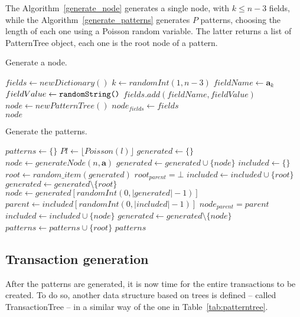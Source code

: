 \documentclass{acm_proc_article-sp-sigmod09}
\begin{document}
The Algorithm~\ref{generate_node} generates a single node, with $k \le n - 3$ fields, while the Algorithm~\ref{generate_patterns} generates $P$ patterns, choosing the length of each one using a Poisson random variable. The latter returns a list of PatternTree object, each one is the root node of a pattern.

\begin{algorithm}
\caption{Generate a node.}
\label{generate_node}
\begin{algorithmic}[1]
\State $fields \gets new Dictionary()$
	\State $k \gets randomInt(1, n - 3)$
	\State $fieldName \gets \boldsymbol{a}_k$
	\State $fieldValue \gets \text{\texttt{randomString()}}$
	\State $fields.add(fieldName, fieldValue)$
\EndFor
\State $node \gets new PatternTree()$
\State $node_{fields} \gets fields$ \\
\Return $node$
\EndFunction
\end{algorithmic}
\end{algorithm}

\begin{algorithm}
\caption{Generate the patterns.}
\label{generate_patterns}
\begin{algorithmic}[1]
\State $patterns \gets \{\}$
	\State $Pl \gets \lfloor Poisson(l) \rfloor$
	\State $generated \gets \{\}$
		\State $node \gets generateNode(n, \boldsymbol{a}) $ 
		\State $generated \gets generated \cup \{node\}$
	\EndFor
	\State $included \gets \{\}$
	\State $root \gets random\_item(generated)$
	\State $root_{parent} = \bot$
	\State $included \gets included \cup \{root\}$
	\State $generated \gets generated \setminus \{root\}$
		\State $node \gets generated[randomInt(0, |generated| - 1)]$
		\State $parent \gets included[randomInt(0, |included| - 1)]$
		\State $node_{parent} = parent$
		\State $included \gets included \cup \{node\}$
		\State $generated \gets generated \setminus \{node\}$
	\EndFor
	\State $patterns \gets patterns \cup \{root\}$
\EndFor
\Return $patterns$
\EndFunction
\end{algorithmic}
\end{algorithm}

\subsection{Transaction generation}
After the patterns are generated, it is now time for the entire transactions to be created. To do so, another data structure based on trees is defined -- called TransactionTree -- in a similar way of the one in Table~\ref{tab:patterntree}.
\end{document}

